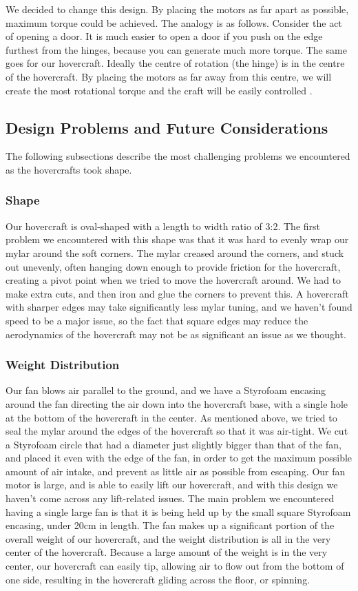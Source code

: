 We decided to change this design. By placing the motors as far apart as possible, maximum torque could be achieved. The analogy is as follows. Consider the act of opening a door. It is much easier to open a door if you push on the edge furthest from the hinges, because you can generate much more torque. The same goes for our hovercraft. Ideally the centre of rotation (the hinge) is in the centre of the hovercraft. By placing the motors as far away from this centre, we will create the most rotational torque and the craft will be easily controlled \cite{831309}.

\subsection{Design Problems and Future Considerations}
The following subsections describe the most challenging problems we encountered as the hovercrafts took shape.  

\subsubsection{Shape}
Our hovercraft is oval-shaped with a length to width ratio of 3:2. The first problem we encountered with this shape was that it was hard to evenly wrap our mylar around the soft corners. The mylar creased around the corners, and stuck out unevenly, often hanging down enough to provide friction for the hovercraft, creating a pivot point when we tried to move the hovercraft around. We had to make extra cuts, and then iron and glue the corners to prevent this. A hovercraft with sharper edges may take significantly less mylar tuning, and we haven't found speed to be a major issue, so the fact that square edges may reduce the aerodynamics of the hovercraft may not be as significant an issue as we thought.

\subsubsection{Weight Distribution}
Our fan blows air parallel to the ground, and we have a Styrofoam encasing around the fan directing the air down into the hovercraft base, with a single hole at the bottom of the hovercraft in the center. As mentioned above, we tried to seal the mylar around the edges of the hovercraft so that it was air-tight. We cut a Styrofoam circle that had a diameter just slightly bigger than that of the fan, and placed it even with the edge of the fan, in order to get the maximum possible amount of air intake, and prevent as little air as possible from escaping. Our fan motor is large, and is able to easily lift our hovercraft, and with this design we haven't come across any lift-related issues. The main problem we encountered having a single large fan is that it is being held up by the small square Styrofoam encasing, under 20cm in length. The fan makes up a significant portion of the overall weight of our hovercraft, and the weight distribution is all in the very center of the hovercraft. Because a large amount of the weight is in the very center, our hovercraft can easily tip, allowing air to flow out from the bottom of one side, resulting in the hovercraft gliding across the floor, or spinning.

